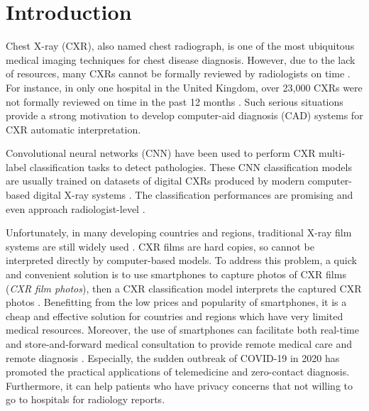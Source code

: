 \documentclass[preprint, 12pt]{elsarticle}
\begin{document}
\section{Introduction} \label{sec:Introduction}

Chest X-ray (CXR), also named chest radiograph, is one of the most ubiquitous medical imaging techniques for chest disease diagnosis. However, due to the lack of resources, many CXRs cannot be formally reviewed by radiologists on time \cite{care2018radiology, royal2015unreported}. For instance, in only one hospital in the United Kingdom, over 23,000 CXRs were not formally reviewed on time in the past 12 months \cite{baltruschat2019comparison}. Such serious situations provide a strong motivation to develop computer-aid diagnosis (CAD) systems for CXR automatic interpretation.

Convolutional neural networks (CNN) have been used to perform CXR multi-label classification tasks to detect pathologies. These CNN classification models are usually trained on datasets of digital CXRs \cite{wang2017chestx,irvin2019chexpert,johnson2019mimic} produced by modern computer-based digital X-ray systems \cite{rajpurkar2017chexnet,pham2021interpreting,yuan2021large,kuo2021recalibration,guan2021discriminative}. The classification performances are promising and even approach radiologist-level \cite{rajpurkar2017chexnet,yuan2021large}.

Unfortunately, in many developing countries and regions, traditional X-ray film systems are still widely used \cite{schwartz2014accuracy,andronikou2011paediatric}. CXR films are hard copies, so cannot be interpreted directly by computer-based models. To address this problem, a quick and convenient solution is to use smartphones to capture photos of CXR films (\textit{CXR film photos}), then a CXR classification model interprets the captured CXR photos \cite{kuo2021recalibration,phillips2020chexphoto, rajpurkar2021chexternal, chong2021gan}. Benefitting from the low prices and popularity of smartphones, it is a cheap and effective solution for countries and regions which have very limited medical resources. Moreover, the use of smartphones can facilitate both real-time and store-and-forward medical consultation to provide remote medical care and remote diagnosis \cite{liu2020application, karako2020realizing}. Especially, the sudden outbreak of COVID-19 in 2020 has promoted the practical applications of telemedicine and zero-contact diagnosis. Furthermore, it can help patients who have privacy concerns that not willing to go to hospitals for radiology reports.
\end{document}
